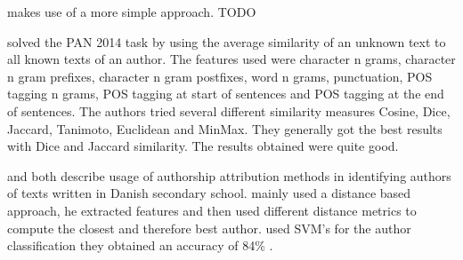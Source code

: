 \cite{layton:2014} makes use of a more simple approach. TODO


\cite{castro2015} solved the PAN 2014 task by using the average similarity of an
unknown text to all known texts of an author. The features used were character n
grams, character n gram prefixes, character n gram postfixes, word n grams,
punctuation, \gls{POS} tagging n grams, \gls{POS} tagging at start of sentences
and \gls{POS} tagging at the end of sentences. The authors tried several
different similarity measures Cosine, Dice, Jaccard, Tanimoto, Euclidean and
MinMax. They generally got the best results with Dice and Jaccard similarity.
The results obtained were quite good.


\cite{hansen2014} and \cite{aalykke2016} both describe usage of authorship
attribution methods in identifying authors of texts written in Danish secondary
school. \cite{aalykke2016} mainly used a distance based approach, he extracted
features and then used different distance metrics to compute the closest and
therefore best author. \cite{hansen2014} used SVM's for the author
classification they obtained an accuracy of 84\% .
